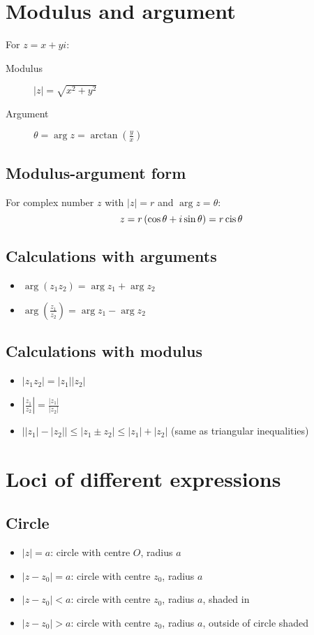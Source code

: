 \section{Modulus and argument}
For $z=x+yi$:
\begin{description}
    \item[Modulus] $|z| = \sqrt{x^2+y^2}$
    \item[Argument] $\theta = \arg z = \arctan\left(\frac{y}{x}\right)$
\end{description}

\subsection{Modulus-argument form}
For complex number $z$ with $|z|=r$ and $\arg z = \theta$:
$$z=r\left(\cos\theta + i\sin\theta\right)=r\operatorname{cis}\theta$$

\subsection{Calculations with arguments}
\begin{itemize}
    \item $\arg\left(z_1z_2\right)=\arg z_1 +\arg z_2$
    \item $\arg\left(\frac{z_1}{z_2}\right)=\arg z_1-\arg z_2$
\end{itemize}

\subsection{Calculations with modulus}
\begin{itemize}
    \item $|z_1z_2|=|z_1||z_2|$
    \item $\left|\frac{z_1}{z_2}\right|=\frac{|z_1|}{|z_2|}$
    \item $\left||z_1|-|z_2|\right| \leq |z_1 \pm z_2| \leq |z_1|+|z_2|$ (same as triangular inequalities)
\end{itemize}

\section{Loci of different expressions}
\subsection{Circle}
\begin{itemize}
    \item $|z| = a$: circle with centre $O$, radius $a$
    \item $|z-z_0|=a$: circle with centre $z_0$, radius $a$
    \item $|z-z_0|<a$: circle with centre $z_0$, radius $a$, shaded in
    \item $|z-z_0|>a$: circle with centre $z_0$, radius $a$, outside of circle shaded
\end{itemize}
